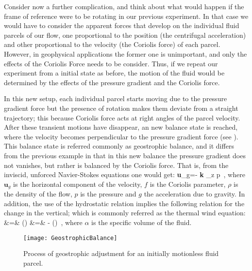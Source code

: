 Consider now a further complication, and think about what would happen if
the frame of reference were to be rotating in our previous experiment. In
that case we would have to consider the apparent forces that develop on
the individual fluid parcels of our flow, one proportional to the
position (the centrifugal acceleration) and other proportional to the
velocity (the Coriolis force) of each parcel. However, in geophysical
applications the former one is unimportant, and only the
effects of the Coriolis Force needs to be consider. Thus, if we repeat
our experiment from a initial state as before, the motion of the fluid
would be determined by the effects of the pressure gradient and the
Coriolis force.

In this new setup, each individual parcel starts moving due to the
pressure gradient force but the presence of rotation makes them deviate
from a straight trajectory; this because Coriolis force acts at right
angles of the parcel velocity. After these transient motions have
disappear, an new balance state is reached, where the velocity becomes
perpendicular to the pressure gradient force (see ).
This balance state is referred commonly as geostrophic balance, and it
differs from the previous example in that in this new balance the
pressure gradient does not vanishes, but rather is balanced by the
Coriolis force. That is, from the inviscid, unforced Navier-Stokes
equations one would get:
\beq
\textbf{u}_g=- \textbf{k} \times \nabla_z p
\,,
where $\textbf{u}_g$ is the horizontal component of the velocity, $f$ is
the Coriolis parameter, $\rho$ is the density of the flow, $p$ is the
pressure and $g$ the acceleration due to gravity. In addition, the use of
the hydrostatic relation implies the following relation for the change in
the vertical; which is commonly referred as the thermal wind
equation:
\bea
{}
    &=&  \left(\right)
\continue
{}
    &=& - \left(\right)
\,,
\label{eq:TWE}
\eea
where $\alpha$ is the specific volume of the fluid.

\begin{figure}
\begin{center}
  \texttt{[image: GeostrophicBalance]}\\
\end{center}
  \caption{Process of geostrophic adjustment for an initially motionless fluid parcel.}
  \label{f:GBalance}
\end{figure}

